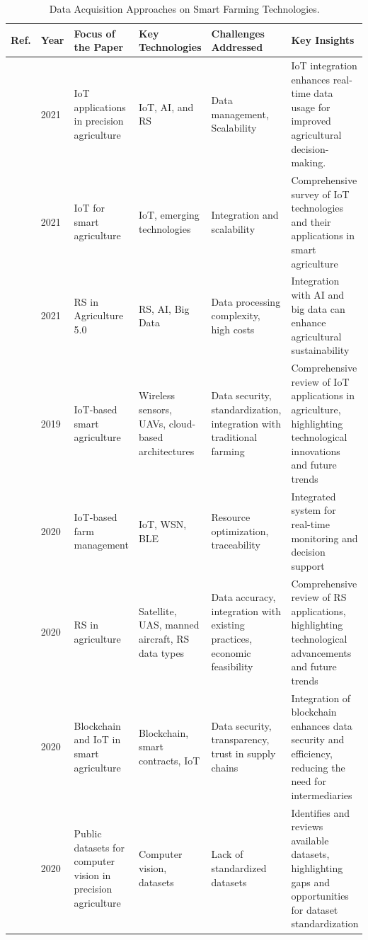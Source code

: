 \documentclass[a4paper,fleqn]{cas-dc}
\begin{document}
\begin{table}[ht]
\scriptsize
\centering
\caption{Data Acquisition Approaches on Smart Farming Technologies.} 
\label{tab:dataset}
\begin{tabular} {p{0.4cm}p{0.5cm}p{3cm}p{3.2cm}p{3cm}p{5cm}}
\toprule
\textbf{Ref.} & \textbf{Year} & \textbf{Focus of the Paper} & \textbf{Key Technologies} & \textbf{Challenges Addressed} & \textbf{Key Insights} \\
\midrule
\cite{mohamed2021smart} & 2021 & IoT applications in precision agriculture & IoT, AI, and RS & Data management, Scalability & IoT integration enhances real-time data usage for improved agricultural decision-making. \\
\midrule
\cite{friha2021internet} & 2021 & IoT for smart agriculture & IoT, emerging technologies & Integration and scalability & Comprehensive survey of IoT technologies and their applications in smart agriculture \\ \midrule
\cite{martos2021ensuring} & 2021 & RS in Agriculture 5.0 & RS, AI, Big Data & Data processing complexity, high costs & Integration with AI and big data can enhance agricultural sustainability \\ \midrule
\cite{ayaz2019internet} & 2019 & IoT-based smart agriculture & Wireless sensors, UAVs, cloud-based architectures & Data security, standardization, integration with traditional farming & Comprehensive review of IoT applications in agriculture, highlighting technological innovations and future trends \\ \midrule
\cite{visconti2020development} & 2020 & IoT-based farm management & IoT, WSN, BLE & Resource optimization, traceability & Integrated system for real-time monitoring and decision support \\ \midrule
\cite{khanal2020remote} & 2020 & RS in agriculture & Satellite, UAS, manned aircraft, RS data types & Data accuracy, integration with existing practices, economic feasibility & Comprehensive review of RS applications, highlighting technological advancements and future trends \\ \midrule
\cite{pranto2021blockchain} & 2020 & Blockchain and IoT in smart agriculture & Blockchain, smart contracts, IoT & Data security, transparency, trust in supply chains & Integration of blockchain enhances data security and efficiency, reducing the need for intermediaries \\ \midrule
\cite{lu2020survey} & 2020 & Public datasets for computer vision in precision agriculture & Computer vision, datasets & Lack of standardized datasets & Identifies and reviews available datasets, highlighting gaps and opportunities for dataset standardization \\ \midrule


\end{tabular}
\end{table}
\end{document}
